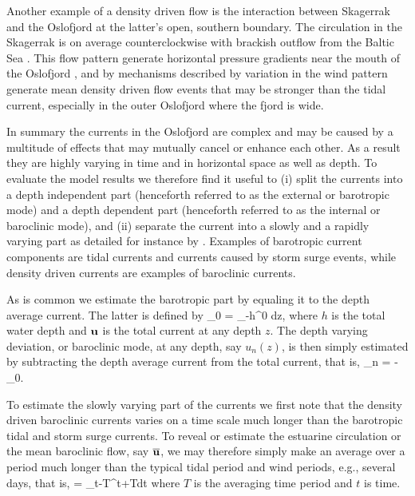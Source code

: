 Another example of a density driven flow is the interaction between Skagerrak and the Oslofjord at the latter's open, southern boundary. The circulation in the Skagerrak is on average counterclockwise with brackish outflow from the Baltic Sea \cite[]{rodhe96, svendsen96, albre:roed:2010}. This flow pattern generate horizontal pressure gradients near the mouth of the Oslofjord \cite[]{baals90}, and by mechanisms described by \cite{klinck81} variation in the wind pattern generate mean density driven flow events that may be stronger than the tidal current, especially in the outer Oslofjord where the fjord is wide.

In summary the currents in the Oslofjord are complex and may be caused by a multitude of effects that may mutually cancel or enhance each other. As a result they are highly varying in time and in horizontal space as well as depth. To evaluate the model results we therefore find it useful to (i) split the currents into a depth independent part (henceforth referred to as the external or barotropic mode) and a depth dependent part (henceforth referred to as the internal or baroclinic mode), and (ii) separate the current into a slowly and a rapidly varying part as detailed for instance by \cite{roed:fossu:2004}. Examples of barotropic current components are tidal currents and currents caused by storm surge events, while density driven currents are examples of baroclinic currents. 

As is common we estimate the barotropic part by equaling it to the depth average current. The latter is defined by
\be
	\label{eq:ubar}
		\bu_0 =  \int_{-h}^{0} \bu dz, 
\ee
where $h$ is the total water depth and $\mathbf{u}$ is the total current at any depth $z$. The depth varying deviation, or baroclinic mode, at any depth, say $u_n(z)$, is then simply estimated by subtracting the depth average current from the total current, that is,
\be
	\label{eq:ubar_un}
		\bu_n = \bu - \bu_0.
\ee

To estimate the slowly varying part of the currents we first note that the density driven baroclinic currents varies on a time scale much longer than the barotropic tidal and storm surge currents. To reveal or estimate the estuarine circulation or the mean baroclinic flow, say $\overline{\mathbf{u}}$, we may therefore simply make an average over a period much longer than the typical tidal period and wind periods, e.g., several days, that is, 
\be
	\label{eq:utime}
		\overline{\bu} = \int_{t-T}^{t+T}\bu dt
\ee
where $T$ is the averaging time period and $t$ is time. 
 
